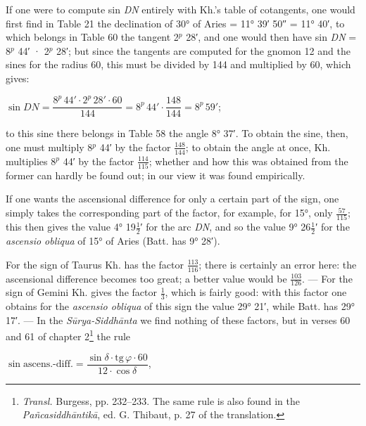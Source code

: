 \documentclass[11pt]{article}
\begin{document}
\par If one were to compute sin \emph{DN} entirely with Kh.'s table of cotangents, one would first find in Table 21 the declination of 30° of Aries = 11° 39′ 50″ = 11° 40′, to which belongs in Table 60 the tangent 2$^{p}$ 28′, and one would then have sin \emph{DN} = 8$^{p}$ 44′ · 2$^{p}$ 28′; but since the tangents are computed for the gnomon 12 and the sines for the radius 60, this must be divided by 144 and multiplied by 60, which gives:\par
\par\begin{center}$\sin DN = \dfrac{8^{p}\,44'\cdot 2^{p}\,28'\cdot 60}{144} = 8^{p}\,44'\cdot\dfrac{148}{144} = 8^{p}\,59'$;\end{center}
\par to this sine there belongs in Table 58 the angle 8° 37′. To obtain the sine, then, one must multiply 8$^{p}$ 44′ by the factor $\tfrac{148}{144}$; to obtain the angle at once, Kh. multiplies 8$^{p}$ 44′ by the factor $\tfrac{114}{115}$; whether and how this was obtained from the former can hardly be found out; in our view it was found empirically.\par
\par If one wants the ascensional difference for only a certain part of the sign, one simply takes the corresponding part of the factor, for example, for 15°, only $\tfrac{57}{115}$; this then gives the value 4° 19$\tfrac{1}{2}$′ for the arc \emph{DN}, and so the value 9° 26$\tfrac{1}{2}$′ for the \emph{ascensio obliqua} of 15° of Aries (Batt. has 9° 28′).\par
\par For the sign of Taurus Kh. has the factor $\tfrac{113}{116}$; there is certainly an error here: the ascensional difference becomes too great; a better value would be $\tfrac{103}{126}$. — For the sign of Gemini Kh. gives the factor $\tfrac{1}{3}$, which is fairly good: with this factor one obtains for the \emph{ascensio obliqua} of this sign the value 29° 21′, while Batt. has 29° 17′. — In the \emph{Sūrya-Siddhānta} we find nothing of these factors, but in verses 60 and 61 of chapter 2\footnote{\emph{Transl.} Burgess, pp. 232–233. The same rule is also found in the \emph{Pañcasiddhāntikā}, ed. G. Thibaut, p. 27 of the translation.} the rule\par
\par\begin{center}$\sin\text{ascens.-diff.} = \dfrac{\sin\delta\cdot\mathrm{tg}\,\varphi\cdot 60}{12\cdot\cos\delta}$,\end{center}
\end{document}
